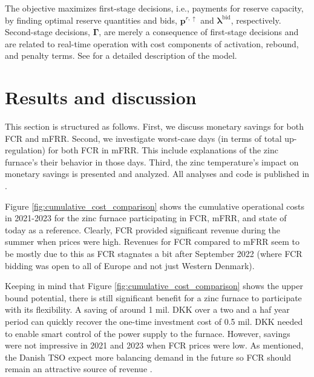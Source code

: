 \documentclass[lettersize,journal]{IEEEtran}
\begin{document}
The objective maximizes first-stage decisions, i.e., payments for reserve capacity, by finding optimal reserve quantities and bids, $\bm{p}^{r,\uparrow}$ and $\bm{\lambda}^{\text{bid}}$, respectively. Second-stage decisions, $\bm{\Gamma}$, are merely a consequence of first-stage decisions and are related to real-time operation with cost components of activation, rebound, and penalty terms. See \cite{gade2023load} for a detailed description of the model.

\section{Results and discussion}

This section is structured as follows. First, we discuss monetary savings for both FCR and mFRR. Second, we investigate worst-case days (in terms of total up-regulation) for both FCR in mFRR. This include explanations of the zinc furnace's their behavior in those days. Third, the zinc temperature's impact on monetary savings is presented and analyzed. All analyses and code is published in \cite{code}.

Figure \ref{fig:cumulative_cost_comparison} shows the cumulative operational costs in 2021-2023 for the zinc furnace participating in FCR, mFRR, and state of today as a reference. Clearly, FCR provided significant revenue during the summer when prices were high. Revenues for FCR compared to mFRR seem to be mostly due to this as FCR stagnates a bit after September 2022 (where FCR bidding was open to all of Europe and not just Western Denmark).

Keeping in mind that Figure \ref{fig:cumulative_cost_comparison} shows the upper bound potential, there is still significant benefit for a zinc furnace to participate with its flexibility. A saving of around 1 mil. DKK over a two and a haf year period can quickly recover the one-time investment cost of 0.5 mil. DKK needed to enable smart control of the power supply to the furnace. However, savings were not impressive in 2021 and 2023 when FCR prices were low. As mentioned, the Danish TSO expect more balancing demand in the future so FCR should remain an attractive source of revenue \cite{energinet:scenario_report_2022}.
\end{document}
